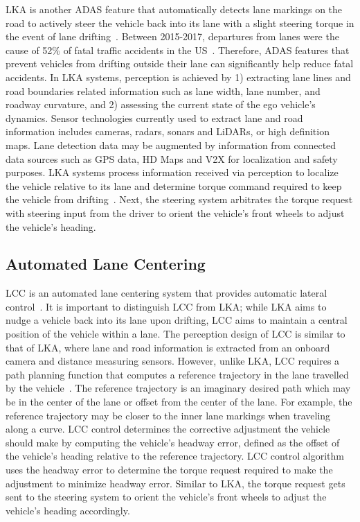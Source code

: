\documentclass{article}
\begin{document}
LKA is another ADAS feature that automatically detects lane markings on the road to actively steer the vehicle back into its lane with a slight steering torque in the event of lane drifting~\cite{Utriainen2020}. Between 2015-2017, departures from lanes were the cause of 52\% of fatal traffic accidents in the US~\cite{Cumali2019}. Therefore, ADAS features that prevent vehicles from drifting outside their lane can significantly help reduce fatal accidents. In LKA systems, perception is achieved by 1) extracting lane lines and road boundaries related information such as lane width, lane number, and roadway curvature, and 2) assessing the current state of the ego vehicle’s dynamics. Sensor technologies currently used to extract lane and road information includes cameras, radars, sonars and LiDARs, or high definition maps. Lane detection data may be augmented by information from connected data sources such as GPS data, HD Maps and V2X for localization and safety purposes. LKA systems process information received via perception to localize the vehicle relative to its lane and determine torque command required to keep the vehicle from drifting~\cite{Lei2006}. Next, the steering system arbitrates the torque request with steering input from the driver to orient the vehicle’s front wheels to adjust the vehicle’s heading.

\subsection{Automated Lane Centering}

LCC is an automated lane centering system that provides automatic lateral control~\cite{Cumali2019}. It is important to distinguish LCC from LKA; while LKA aims to nudge a vehicle back into its lane upon drifting, LCC aims to maintain a central position of the vehicle within a lane. The perception design of LCC is similar to that of LKA, where lane and road information is extracted from an onboard camera and distance measuring sensors. However, unlike LKA, LCC requires a path planning function that  computes a reference trajectory in the lane travelled by the vehicle~\cite{Cumali2019}. The reference trajectory is an imaginary desired path which may be in the center of the lane or offset from the center of the lane. For example, the reference trajectory may be closer to the inner lane markings when traveling along a curve. LCC control determines the corrective adjustment the vehicle should make by computing the vehicle’s headway error, defined as the offset of the vehicle’s heading relative to the reference trajectory. LCC control algorithm uses the headway error to determine the  torque request required to make the adjustment to minimize headway error. Similar to LKA, the torque request gets sent to the steering system to orient the vehicle’s front wheels to adjust the vehicle’s heading accordingly.
\end{document}
